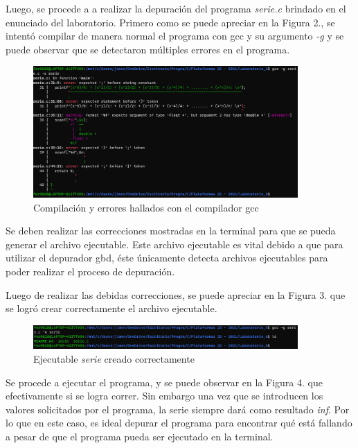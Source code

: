 \documentclass[12pt,a4paper]{article}
\begin{document}
Luego, se procede a a realizar la depuración del programa \textit{serie.c} brindado en el enunciado del laboratorio. Primero como se puede apreciar en la Figura 2., se intentó compilar de manera normal el programa con gcc y su argumento \textit{-g} y se puede observar que se detectaron múltiples errores en el programa.

\begin{figure}[H]
    \centering
    \center
    \includegraphics[width=0.9\textwidth]{Fotos_Lab6/Figura2.png}
    \caption{Compilación y errores hallados con el compilador gcc}
    \label{1}
\end{figure}

Se deben realizar las correcciones mostradas en la terminal para que se pueda generar el archivo ejecutable. Este archivo ejecutable es vital debido a que para utilizar el depurador gbd, éste únicamente detecta archivos ejecutables para poder realizar el proceso de depuración. 

Luego de realizar las debidas correcciones, se puede apreciar en la Figura 3. que se logró crear correctamente el archivo ejecutable.

\begin{figure}[H]
    \centering
    \center
    \includegraphics[width=0.9\textwidth]{Fotos_Lab6/Figura3.png}
    \caption{Ejecutable \textit{serie} creado correctamente}
    \label{1}
\end{figure}

Se procede a ejecutar el programa, y se puede observar en la Figura 4. que efectivamente si se logra correr. Sin embargo una vez que se introducen los valores solicitados por el programa, la serie siempre dará como resultado \textit{inf}. Por lo que en este caso, es ideal depurar el programa para encontrar qué está fallando a pesar de que el programa pueda ser ejecutado en la terminal. 
\end{document}
